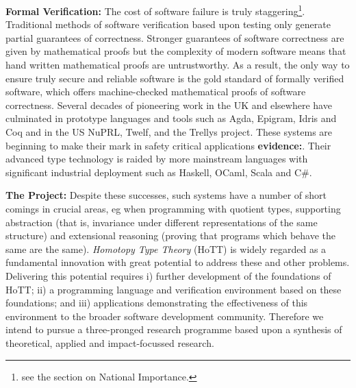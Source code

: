 \documentclass[a4paper,11pt]{article}
\begin{document}
{\bf Formal Verification:} The cost of software failure is truly
staggering\footnote{see the section on National
  Importance.}. Traditional methods of software verification based upon
testing only generate partial guarantees of correctness. Stronger
guarantees of software correctness are given by mathematical proofs
but the complexity of modern software means that hand written
mathematical proofs are untrustworthy. As a result, the only way to
ensure truly secure and reliable software is the gold standard of
formally verified software, which offers machine-checked mathematical
proofs of software correctness. Several decades of pioneering work in
the UK and elsewhere have culminated in prototype languages and tools
such as Agda, Epigram, Idris and Coq and in the US NuPRL, Twelf, and
the Trellys project. These systems are beginning to make their mark in
safety critical applications {\bf evidence:}. Their advanced type
technology is raided by more mainstream languages with significant
industrial deployment such as Haskell, OCaml, Scala and C\#.

{\bf The Project:} Despite these successes, such systems have a number
of short comings in crucial areas, eg when programming with quotient
types, supporting abstraction (that is, invariance under different
representations of the same structure) and extensional reasoning
(proving that programs which behave the same are the same).  {\em
  Homotopy Type Theory} (HoTT) is widely regarded as a fundamental
innovation with great potential to address these and other problems.
Delivering this potential requires i) further
development of the foundations of HoTT; ii)
a programming language and verification environment based on
these foundations; and iii) applications demonstrating the effectiveness
of this environment to the broader software development community.
Therefore we intend to pursue a three-pronged
research programme based upon a synthesis of theoretical, applied and
impact-focussed research.


\end{document}

